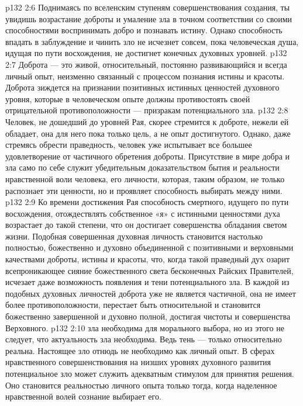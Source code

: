 \vs p132 2:6 \pc Поднимаясь по вселенским ступеням совершенствования создания, ты увидишь возрастание доброты и умаление зла в точном соответствии со своими способностями воспринимать добро и познавать истину. Однако способность впадать в заблуждение и чинить зло не исчезнет совсем, пока человеческая душа, идущая по пути восхождения, не достигнет конечных духовных уровней.
\vs p132 2:7 Доброта --- это живой, относительный, постоянно развивающийся и всегда личный опыт, неизменно связанный с процессом познания истины и красоты. Доброта зиждется на признании позитивных истинных ценностей духовного уровня, которые в человеческом опыте должны противостоять своей отрицательной противоположности --- призракам потенциального зла.
\vs p132 2:8 \pc Человек, не дошедший до уровней Рая, скорее стремится к доброте, нежели ей обладает, она для него пока только цель, а не опыт достигнутого. Однако, даже стремясь обрести праведность, человек уже испытывает все большее удовлетворение от частичного обретения доброты. Присутствие в мире добра и зла само по себе служит убедительным доказательством бытия и реальности нравственной воли человека, его личности, которая, таким образом, не только распознает эти ценности, но и проявляет способность выбирать между ними.
\vs p132 2:9 Ко времени достижения Рая способность смертного, идущего по пути восхождения, отождествлять собственное «я» с истинными ценностями духа возрастает до такой степени, что он достигает совершенства обладания светом жизни. Подобная совершенная духовная личность становится настолько полностью, божественно и духовно объединенной с позитивными и верховными качествами доброты, истины и красоты, что, когда такой праведный дух озарит всепроникающее сияние божественного света бесконечных Райских Правителей, исчезает даже возможность появления и тени потенциального зла. В каждой из подобных духовных личностей доброта уже не является частичной, она не имеет более противоположности, перестает быть относительной и становится божественно завершенной и духовно полной, достигая чистоты и совершенства Верховного.
\vs p132 2:10  зла необходима для морального выбора, но из этого не следует, что актуальность зла необходима. Ведь тень --- только относительно реальна. Настоящее зло отнюдь не необходимо как личный опыт. В сферах нравственного совершенствования на низших уровнях духовного развития потенциальное зло может служить адекватным стимулом для принятия решения. Оно становится реальностью личного опыта только тогда, когда наделенное нравственной волей сознание выбирает его.
